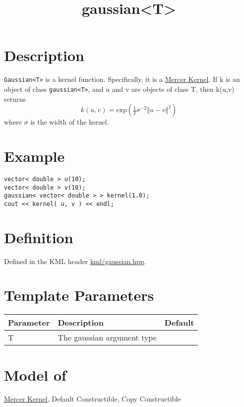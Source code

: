 \documentclass{article}
\newcommand{\half}{\tfrac{1}{2}}
\begin{document}
\title{gaussian<T>}
\maketitle

\section*{Description}

\texttt{Gaussian<T>} is a kernel function. Specifically, it is a \href{\kmlroot/mercer_kernel.html}{Mercer Kernel}. If k is an object of class \texttt{gaussian<T>}, and u and v are objects of class T, then k(u,v) returns
%
$$k(u,v) = \textrm{exp}( \half \sigma^{-2} \Vert u-v \Vert^2 ) $$
%
where $\sigma$ is the width of the kernel. 


\section*{Example}


\highlightcpp{}
\begin{verbatim}
vector< double > u(10);
vector< double > v(10);
gaussian< vector< double > > kernel(1.0);
cout << kernel( u, v ) << endl;
\end{verbatim}


\section*{Definition}

Defined in the KML header \href{\kmlroot/gaussian.hpp}{kml/gaussian.hpp}.


\section*{Template Parameters}

\begin{tabular}{lll}
\textbf{Parameter} & \textbf{Description} & \textbf{Default} \\ 
\hline
T & The gaussian argument type \\ 
\end{tabular}


\section*{Model of}

\href{\kmlroot/mercer_kernel.html}{Mercer Kernel}, 
Default Constructible, Copy Constructible
\end{document}
